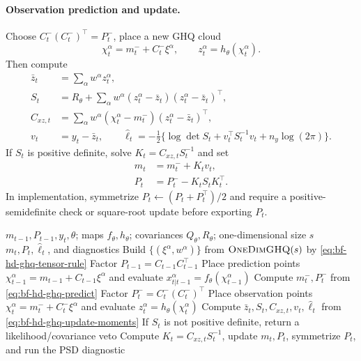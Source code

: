 \paragraph{Observation prediction and update.}
Choose \(C_t^-(C_t^-)^\top=P_t^-\), place a new GHQ cloud
\[
  \chi_t^\alpha=m_t^-+C_t^-\xi^\alpha,\qquad
  z_t^\alpha=h_\theta(\chi_t^\alpha).
\]
Then compute
\begin{align}
  \bar z_t&=\sum_\alpha w^\alpha z_t^\alpha,\\
  S_t&=R_\theta+
  \sum_\alpha w^\alpha(z_t^\alpha-\bar z_t)(z_t^\alpha-\bar z_t)^\top,\\
  C_{xz,t}&=
  \sum_\alpha w^\alpha(\chi_t^\alpha-m_t^-)(z_t^\alpha-\bar z_t)^\top,\\
  v_t&=y_t-\bar z_t,\qquad
  \widehat\ell_t=-\frac12\{\log\det S_t+v_t^\top S_t^{-1}v_t+n_y\log(2\pi)\}.
  \label{eq:bf-hd-ghq-update-moments}
\end{align}
If \(S_t\) is positive definite, solve \(K_t=C_{xz,t}S_t^{-1}\) and set
\begin{align}
  m_t&=m_t^-+K_tv_t,\\
  P_t&=P_t^- - K_tS_tK_t^\top .
  \label{eq:bf-hd-ghq-update}
\end{align}
In implementation, symmetrize \(P_t\leftarrow(P_t+P_t^\top)/2\) and require a
positive-semidefinite check or square-root update before exporting \(P_t\).

\begin{algorithm}
\caption{One Tensor-Product GHQF Step}
\label{alg:bf-hd-ghqf-step}
\begin{algorithmic}[1]
\Require \(m_{t-1},P_{t-1},y_t,\theta\); maps \(f_\theta,h_\theta\); covariances
\(Q_\theta,R_\theta\); one-dimensional size \(s\)
\Ensure \(m_t,P_t,\widehat\ell_t\), and diagnostics
\State Build \(\{(\xi^\alpha,w^\alpha)\}\) from \(\textsc{OneDimGHQ}(s)\) by
\eqref{eq:bf-hd-ghq-tensor-rule}
\State Factor \(P_{t-1}=C_{t-1}C_{t-1}^\top\)
\State Place prediction points \(\chi_{t-1}^\alpha=m_{t-1}+C_{t-1}\xi^\alpha\)
and evaluate \(x_{t|t-1}^\alpha=f_\theta(\chi_{t-1}^\alpha)\)
\State Compute \(m_t^-,P_t^-\) from \eqref{eq:bf-hd-ghq-predict}
\State Factor \(P_t^-=C_t^-(C_t^-)^\top\)
\State Place observation points \(\chi_t^\alpha=m_t^-+C_t^-\xi^\alpha\) and
evaluate \(z_t^\alpha=h_\theta(\chi_t^\alpha)\)
\State Compute \(\bar z_t,S_t,C_{xz,t},v_t,\widehat\ell_t\) from
\eqref{eq:bf-hd-ghq-update-moments}
\State If \(S_t\) is not positive definite, return a likelihood/covariance veto
\State Compute \(K_t=C_{xz,t}S_t^{-1}\), update \(m_t,P_t\), symmetrize \(P_t\),
and run the PSD diagnostic
\end{algorithmic}
\end{algorithm}

